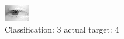 \begin{figure}[h!]
\begin{center}
\includegraphics[width=0.60\columnwidth]{figures/ID2663_class_3_target_4.png}
\end{center}
\caption{ Classification: 3 actual target: 4}
\label{fig:ID2663_class_3_target_4}
\end{figure}
